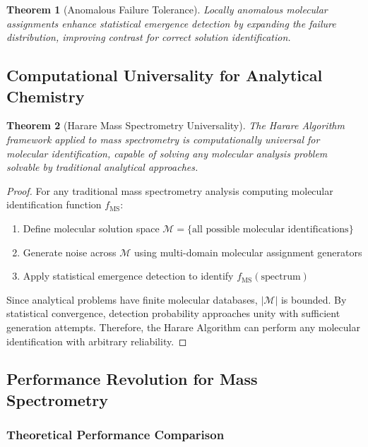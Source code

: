 \documentclass[11pt,a4paper]{article}
\newtheorem{theorem}{Theorem}[section]
\theoremstyle{remark}
\begin{document}
\begin{theorem}[Anomalous Failure Tolerance]
Locally anomalous molecular assignments enhance statistical emergence detection by expanding the failure distribution, improving contrast for correct solution identification.
\end{theorem}

\subsection{Computational Universality for Analytical Chemistry}

\begin{theorem}[Harare Mass Spectrometry Universality]
The Harare Algorithm framework applied to mass spectrometry is computationally universal for molecular identification, capable of solving any molecular analysis problem solvable by traditional analytical approaches.
\end{theorem}

\begin{proof}
For any traditional mass spectrometry analysis computing molecular identification function $f_{\text{MS}}$:
\begin{enumerate}
\item Define molecular solution space $\mathcal{M} = \{\text{all possible molecular identifications}\}$
\item Generate noise across $\mathcal{M}$ using multi-domain molecular assignment generators
\item Apply statistical emergence detection to identify $f_{\text{MS}}(\text{spectrum})$
\end{enumerate}

Since analytical problems have finite molecular databases, $|\mathcal{M}|$ is bounded. By statistical convergence, detection probability approaches unity with sufficient generation attempts. Therefore, the Harare Algorithm can perform any molecular identification with arbitrary reliability.
\end{proof}

\subsection{Performance Revolution for Mass Spectrometry}

\subsubsection{Theoretical Performance Comparison}
\end{document}

